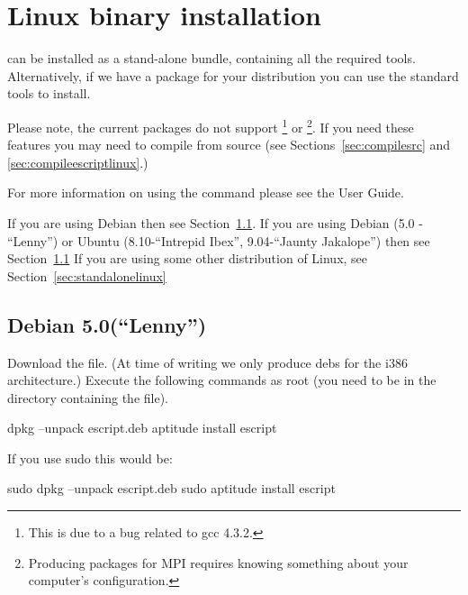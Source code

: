 
%
%
%

\section{Linux binary installation}
\label{sec:binlinux}

\esfinley can be installed as a stand-alone bundle, containing all the required tools.
Alternatively, if we have a package for your distribution you can use the standard tools to install.

Please note, the current packages do not support \openmp\footnote{This is due to a bug related to gcc 4.3.2.} or \mpi\footnote{Producing packages for MPI requires knowing something about your computer's configuration.}.
If you need these features you may need to compile \esfinley from source (see Sections~\ref{sec:compilesrc} and \ref{sec:compileescriptlinux}.)

For more information on using the  command please see the User Guide.

If you are using Debian then see Section~\ref{sec:lenny}.
If you are using Debian (5.0 - ``Lenny'') or Ubuntu (8.10-``Intrepid Ibex'', 9.04-``Jaunty Jakalope'') then see Section~\ref{sec:lenny}
If you are using some other distribution of Linux, see Section~\ref{sec:standalonelinux} 


\subsection{Debian 5.0(``Lenny'')}\label{sec:lenny}

Download the  file.
(At time of writing we only produce debs for the i386 architecture.)
Execute the following commands as root (you need to be in the directory containing the file).
\begin{shellCode}
 dpkg --unpack escript.deb
 aptitude install escript
\end{shellCode}

If you use sudo this would be:
\begin{shellCode}
sudo dpkg --unpack escript.deb
sudo aptitude install escript
\end{shellCode}


